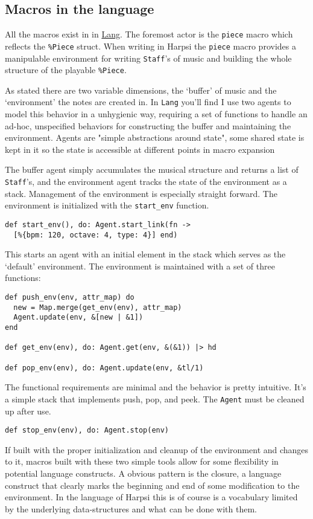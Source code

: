 \documentclass[11pt]{article}
\begin{document}
\subsection{Macros in the language}
\label{sec-3-2}
All the macros exist in in \href{lib/lang.ex}{Lang}. The foremost actor is
the \verb~piece~ macro which reflects the \verb~%Piece~ struct. When writing
in Harpsi the \verb~piece~ macro provides a manipulable environment for
writing \verb~Staff~'s of music and building the whole structure of the
playable \verb~%Piece~.

As stated there are two variable dimensions, the `buffer' of music
and the `environment' the notes are created in. In \verb~Lang~ you'll
find I use two agents to model this behavior in a unhygienic way,
requiring a set of functions to handle an ad-hoc, unspecified
behaviors for constructing the buffer and maintaining the
environment. Agents are "simple abstractions around state", some
shared state is kept in it so the state is accessible at different
points in macro expansion

The buffer agent simply accumulates the musical structure and
returns a list of \verb~Staff~'s, and the environment agent tracks the
state of the environment as a stack. Management of the environment
is especially straight forward. The environment is initialized with
the \verb~start_env~ function.
\begin{verbatim}
def start_env(), do: Agent.start_link(fn ->
  [%{bpm: 120, octave: 4, type: 4}] end)
\end{verbatim}
This starts an agent with an initial element in the stack which
serves as the `default' environment. The environment is maintained
with a set of three functions:
\begin{verbatim}
def push_env(env, attr_map) do
  new = Map.merge(get_env(env), attr_map)
  Agent.update(env, &[new | &1])
end

def get_env(env), do: Agent.get(env, &(&1)) |> hd

def pop_env(env), do: Agent.update(env, &tl/1)
\end{verbatim}
The functional requirements are minimal and the behavior
is pretty intuitive. It's a simple stack that implements push, pop,
and peek. The \verb~Agent~ must be cleaned up after use.
\begin{verbatim}
def stop_env(env), do: Agent.stop(env)
\end{verbatim}

If built with the proper initialization and cleanup of the
environment and changes to it, macros built with these two simple
tools allow for some flexibility in potential language
constructs. A obvious pattern is the closure, a language construct
that clearly marks the beginning and end of some modification to
the environment. In the language of Harpsi this is of course is a
vocabulary limited by the underlying data-structures and what can
be done with them.
\end{document}

